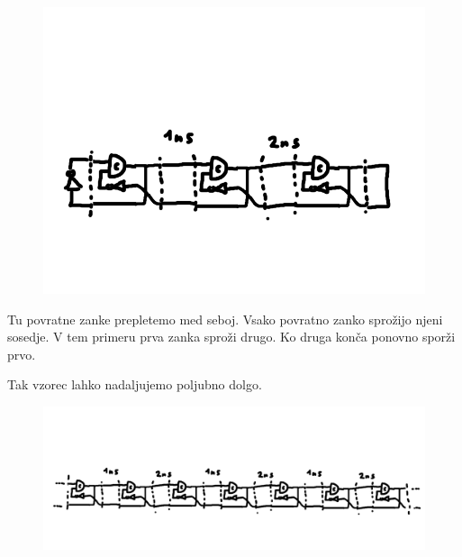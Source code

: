 \begin{figure}[H]
	\centering
	\includegraphics[width=0.7\linewidth]{slike/osnove/dly4}
	\caption{}
	\label{fig:celement}
\end{figure}

Tu povratne zanke prepletemo med seboj. Vsako povratno zanko sprožijo njeni sosedje. V tem primeru prva zanka sproži drugo. Ko druga konča ponovno sporži prvo.

Tak vzorec lahko nadaljujemo poljubno dolgo.
\begin{figure}[H]
	\centering
	\includegraphics[width=0.7\linewidth]{slike/osnove/dly5}
	\caption{}
	\label{fig:celement}
\end{figure}





